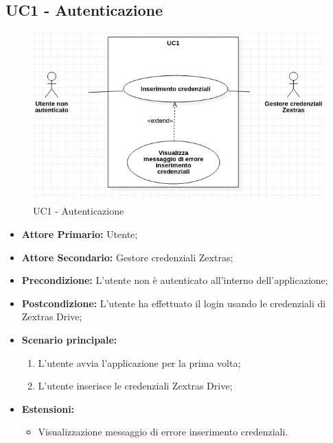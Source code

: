 \subsection{UC1 - Autenticazione}
\begin{figure}[H]
    \centering
    \includegraphics[scale = 0.7]{components/img/UC1.png}
    \caption{UC1 - Autenticazione}
\end{figure}
\begin{itemize}
\item \textbf{Attore Primario:} Utente;
\item \textbf{Attore Secondario:} Gestore credenziali Zextras;
\item \textbf{Precondizione:} L'utente non è autenticato all'interno dell'applicazione;
\item \textbf{Postcondizione:} L'utente ha effettuato il login usando le credenziali di Zextras Drive;
\item \textbf{Scenario principale:}
    \begin{enumerate}
    \item L'utente avvia l'applicazione per la prima volta;
    \item L'utente inserisce le credenziali Zextras Drive;
    \end{enumerate}
\item \textbf{Estensioni:}
\begin{itemize}
\item Visualizzazione messaggio di errore inserimento credenziali.
\end{itemize}
\end{itemize}